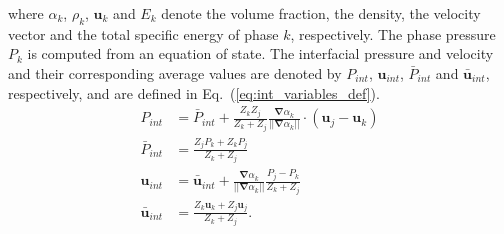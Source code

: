 \documentclass[preprint,10pt]{elsarticle}
\renewcommand{\div}{\mbold{\nabla}\! \cdot \!}
\newcommand{\grad}{\mbold{\nabla}}
\newcommand{\mbold}[1]{\boldsymbol#1}
\newcommand{\eqt}[1]{Eq.~(\ref{#1})}                     %
\begin{document}
%
where $\alpha_k$, $\rho_k$, $\mbold u_k$ and $E_k$ denote the volume fraction, the density, the velocity vector and the total specific energy of phase $k$, respectively. The phase pressure $P_k$ is computed from an equation of state. The interfacial pressure and velocity and their corresponding average values are denoted by $P_{int}$, $\mbold u_{int}$, $\bar{P}_{int}$ and $\bar{\mbold u}_{int}$, respectively, and are defined in \eqt{eq:int_variables_def}. 
%
\begin{subequations}
\label{eq:int_variables_def}
\begin{align}
  \label{E-R:83}
  P_{int} &= \bar{P}_{int} + \frac{Z_{k}Z_{j}}{Z_{k}+Z_{j}} \frac{\grad \alpha_{k}}{|| \grad \alpha_{k} ||} \cdot (\mbold u_{j}-\mbold u_{k})
  \\
  \bar{P}_{int} &= \frac{Z_{j}P_{k}+Z_{k}P_{j}}{Z_{k}+Z_{j}}
 \\
  \label{E-R:84}
  \mbold u_{int} &= \bar{\mbold u}_{int} +  \frac{\grad \alpha_{k}}{|| \grad \alpha_{k} ||} \frac{P_{j}-P_{k}}{Z_{k}+Z_{j}}
  \\
  \bar{\mbold u}_{int} &= \frac{Z_{k} \mbold u_{k}+Z_{j}\mbold u_{j}}{Z_{k}+Z_{j}}.
\end{align}
\end{subequations}
\end{document}
